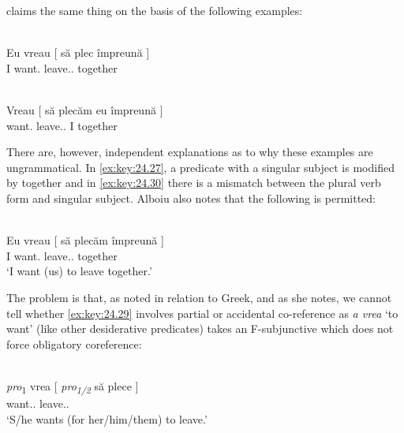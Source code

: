 \documentclass[output=paper]{langsci/langscibook}
\begin{document}
\ea%
    \label{ex:key:24.26} 
	\z
\z

\citet[10]{Alboiu2007} claims the same thing on the basis of the following
examples:

\ea%
\label{ex:key:24.27}\\
	\gll \llap{*}Eu vreau   [ să   plec      împreună ]\\
        I   want.\Fsg{} {} \Sbjv{}   leave.\Sbjv{}.\Fsg{}  together\\
\z

\ea%
\label{ex:key:24.28}\\
	\gll \llap{*}Vreau     [ să   plecăm       eu  împreună ]\\
    want.\Fsg{} {}  \Sbjv{}   leave.\Sbjv{}.\Fpl{}   I  together\\
\z

There are, however, independent explanations as to why these examples are
ungrammatical. In \eqref{ex:key:24.27}, a predicate with a singular subject is modified by
together and in \eqref{ex:key:24.30} there is a mismatch between the plural verb form and
singular subject. Alboiu also notes that the following is permitted:\newpage

\ea%
\label{ex:key:24.29}  \citep[10]{Alboiu2007}\\
	\gll Eu vreau     [ să   plecăm      împreună ]\\
    I   want.\Fsg{} {} \Sbjv{}   leave.\Sbjv{}.\Fpl{}   together\\
	\glt ‘I want (us) to leave together.’
\z

The problem is that, as noted in relation to Greek, and as she notes, we cannot
tell whether \eqref{ex:key:24.29} involves partial  or accidental co-reference as
\emph{a vrea} ‘to want’ (like other desiderative predicates) takes an
F-subjunctive which does not force obligatory coreference:

\ea%
    \label{ex:key:24.30}  \citep[11]{Alboiu2007}\\
	\gll \emph{pro}\textsubscript{1}   vrea       [ \emph{pro\textsubscript{1/2}} să   plece ]\\
        {} want.\Prs.\Tsg{}  {} {} \Sbjv{}   leave.\Sbjv{}.\Third{}\\
	\glt ‘S/he wants (for her/him/them) to leave.’
\z
\end{document}
